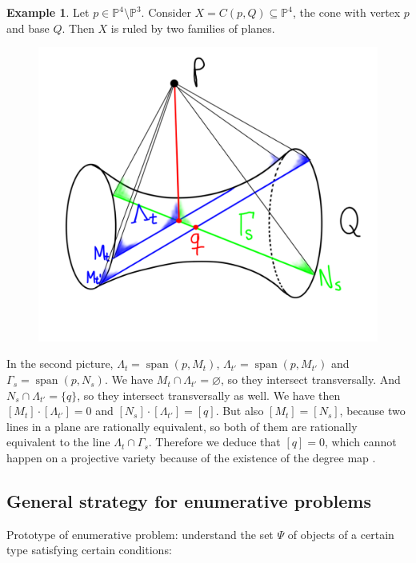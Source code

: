 \documentclass[12pt,a4paper]{amsart}
\theoremstyle{plain}
\theoremstyle{definition}
\newtheorem{exmp}[thm]{Example}
\theoremstyle{remark}
\begin{document}
\begin{exmp}
    Let $p\in \mathbb{P}^{4}\setminus \mathbb{P}^{3}$.
    Consider $X=C(p,Q)\subseteq \mathbb{P}^{4}$, the cone with vertex $p$ and base $Q$.
    Then $X$ is ruled by two families of planes.
    \begin{figure}[H]
	\centering
	\includegraphics[scale=.2]{pictures/cone}
    \end{figure}
    In the second picture, $\Lambda_{t}=\operatorname{span}(p,M_{t})$, $\Lambda_{t'}=\operatorname{span}(p,M_{t'})$ and $\Gamma_{s}=\operatorname{span}(p,N_{s})$.
    We have $M_{t}\cap \Lambda_{t'}=\varnothing$, so they intersect transversally.
    And $N_{s}\cap \Lambda_{t'}=\{ q\}$, so they intersect transversally as well.
    We have then $[M_{t}]\cdot [\Lambda_{t'}]=0$ and $[N_{s}]\cdot [\Lambda_{t'}]=[q]$.
    But also $[M_{t}]=[N_{s}]$, because two lines in a plane are rationally equivalent, so both of them are rationally equivalent to the line $\Lambda_{t}\cap \Gamma_{s}$.
    Therefore we deduce that $[q]=0$, which cannot happen on a projective variety because of the existence of the degree map \cite[Proposition 1.21]{eh16}.
\end{exmp}

\subsection{General strategy for enumerative problems}

Prototype of enumerative problem: understand the set $\Psi$ of objects of a certain type satisfying certain conditions:
\end{document}
